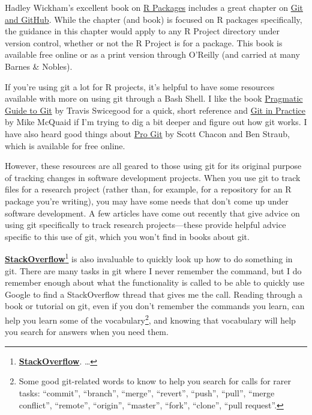 \documentclass[]{tufte-book}
\begin{document}
Hadley Wickham's excellent book on \href{http://r-pkgs.had.co.nz/}{R Packages} includes a great
chapter on \href{http://r-pkgs.had.co.nz/git.html}{Git and GitHub}. While the chapter (and book) is
focused on R packages specifically, the guidance in this chapter would apply to any
R Project directory under version control, whether or not the R Project is for a package.
This book is available free online or as a print version through O'Reilly (and
carried at many Barnes \& Nobles).

If you're using git a lot for R projects, it's helpful to have some resources available with
more on using git through a Bash Shell. I like the book \href{https://www.amazon.com/Pragmatic-Guide-Git-Programmers/dp/1934356727/ref=sr_1_28?keywords=git\&qid=1554173700\&s=gateway\&sr=8-28}{Pragmatic Guide to Git} by Travis Swicegood for a quick, short reference and
\href{https://www.amazon.com/Git-Practice-Techniques-Mike-McQuaid/dp/1617291978/ref=sr_1_60?keywords=git\&qid=1554174811\&s=gateway\&sr=8-60}{Git in Practice} by Mike McQuaid if I'm trying to dig a bit deeper
and figure out how git works.
I have also heard good things about \href{https://git-scm.com/book/en/v2}{Pro Git} by Scott Chacon and
Ben Straub, which is available for free online.

However, these resources are all geared to those using git for its original purpose of
tracking changes in software development projects. When you use git to track files for a research
project (rather than, for example, for a repository for an R package you're writing), you
may have some needs that don't come up under software development. A few articles have come
out recently that give advice on using git specifically to track research projects---these provide
helpful advice specific to this use of git, which you won't find in books about git.

\href{https://stackoverflow.com/}{\textbf{StackOverflow}}\footnote{\href{https://stackoverflow.com/}{\textbf{StackOverflow}}.
  \ldots{}}
is also invaluable to quickly look up how to do something in git. There are
many tasks in git where I never remember the command, but I do remember enough about what
the functionality is called to be able to quickly use Google to find a StackOverflow thread
that gives me the call. Reading through a book or tutorial on git, even if you don't
remember the commands you learn, can help you learn some of the vocabulary\footnote{Some good git-related
  words to know to help you search for calls for rarer tasks: ``commit'', ``branch'', ``merge'', ``revert'',
  ``push'', ``pull'', ``merge conflict'', ``remote'', ``origin'', ``master'', ``fork'', ``clone'', ``pull request''.},
and knowing that vocabulary will help you search for answers when you need them.
\end{document}
